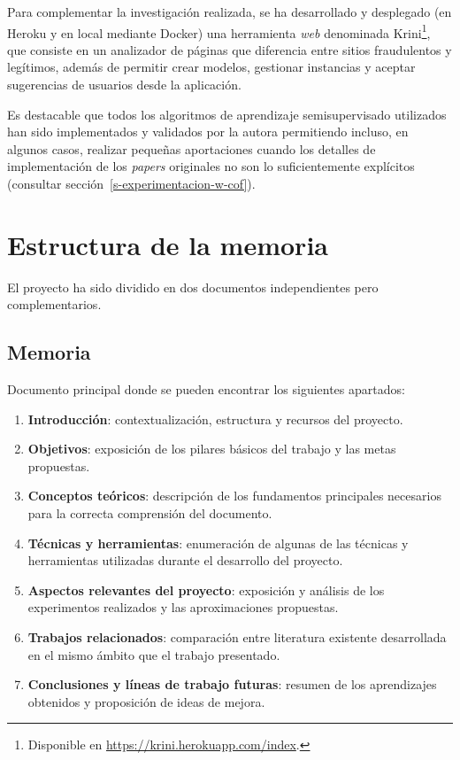 Para complementar la investigación realizada, se ha desarrollado y desplegado (en Heroku y en local mediante Docker) una herramienta \textit{web} denominada Krini\footnote{Disponible en \url{https://krini.herokuapp.com/index}.}, que consiste en un analizador de páginas que diferencia entre sitios fraudulentos y legítimos, además de permitir crear modelos, gestionar instancias y aceptar sugerencias de usuarios desde la aplicación.

Es destacable que todos los algoritmos de aprendizaje semisupervisado utilizados han sido implementados y validados por la autora permitiendo incluso, en algunos casos, realizar pequeñas aportaciones cuando los detalles de implementación de los \textit{papers} originales no son lo suficientemente explícitos (consultar sección~\ref{s-experimentacion-w-cof}).


\section{Estructura de la memoria}

El proyecto ha sido dividido en dos documentos independientes pero complementarios.

\subsection{Memoria}

Documento principal donde se pueden encontrar los siguientes apartados:

\begin{enumerate}
	\item \textbf{Introducción}: contextualización, estructura y recursos del proyecto.
	\item \textbf{Objetivos}: exposición de los pilares básicos del trabajo y las metas propuestas.
	\item \textbf{Conceptos teóricos}: descripción de los fundamentos principales necesarios para la correcta comprensión del documento.
	\item \textbf{Técnicas y herramientas}: enumeración de algunas de las técnicas y herramientas utilizadas durante el desarrollo del proyecto.
	\item \textbf{Aspectos relevantes del proyecto}: exposición y análisis de los experimentos realizados y las aproximaciones propuestas.
	\item \textbf{Trabajos relacionados}: comparación entre literatura existente desarrollada en el mismo ámbito que el trabajo presentado.
	\item \textbf{Conclusiones y líneas de trabajo futuras}: resumen de los aprendizajes obtenidos y proposición de ideas de mejora.
\end{enumerate}

